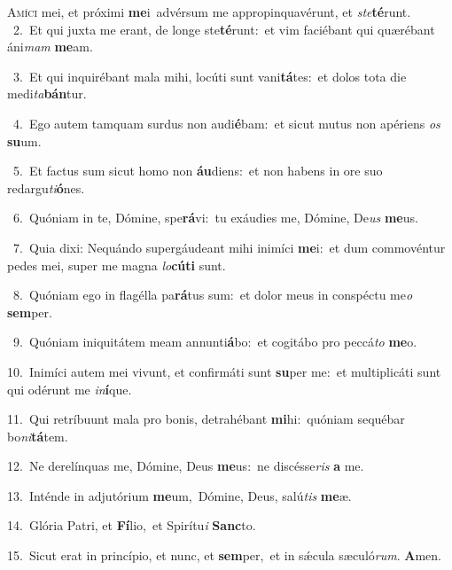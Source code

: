 \lettrine{\initial\textcolor{\initialcolor}{A}}{míci} mei, et próximi \textbf{me}\-i~\star advérsum me appropinquavérunt, et \textit{ste}\-\textbf{té}runt.\\
{\numbfont\textcolor{\numbcolor}{~2.}}~Et qui juxta me erant, de longe ste\-\textbf{té}\-runt:~\star et vim faciébant qui quærébant áni\textit{mam} \textbf{me}\-am.\par
{\numbfont\textcolor{\numbcolor}{~3.}}~Et qui inquirébant mala mihi, locúti sunt vani\-\textbf{tá}\-tes:~\star et dolos tota die medi\-\textit{ta}\-\textbf{bán}tur.\par
{\numbfont\textcolor{\numbcolor}{~4.}}~Ego autem tamquam surdus non audi\-\textbf{é}\-bam:~\star et sicut mutus non apériens \textit{os} \textbf{su}\-um.\par
{\numbfont\textcolor{\numbcolor}{~5.}}~Et factus sum sicut homo non \textbf{áu}\-diens:~\star et non habens in ore suo redargu\-\textit{ti}\-\textbf{ó}nes.\par
{\numbfont\textcolor{\numbcolor}{~6.}}~Quóniam in te, Dómine, spe\-\textbf{rá}\-vi:~\star tu exáudies me, Dómine, De\textit{us} \textbf{me}\-us.\par
{\numbfont\textcolor{\numbcolor}{~7.}}~Quia dixi: Nequándo supergáudeant mihi inimíci \textbf{me}\-i:~\star et dum commovéntur pedes mei, super me magna \textit{lo}\-\textbf{cú}\textbf{ti} sunt.\par
{\numbfont\textcolor{\numbcolor}{~8.}}~Quóniam ego in flagélla pa\-\textbf{rá}\-tus sum:~\star et dolor meus in conspéctu me\textit{o} \textbf{sem}\-per.\par
{\numbfont\textcolor{\numbcolor}{~9.}}~Quóniam iniquitátem meam annunti\-\textbf{á}\-bo:~\star et cogitábo pro peccá\textit{to} \textbf{me}\-o.\par
{\numbfont\textcolor{\numbcolor}{10.}}~Inimíci autem mei vivunt, et confirmáti sunt \textbf{su}\-per me:~\star et multiplicáti sunt qui odérunt me \textit{in}\-\textbf{í}que.\par
{\numbfont\textcolor{\numbcolor}{11.}}~Qui retríbuunt mala pro bonis, detrahébant \textbf{mi}\-hi:~\star quóniam sequébar bo\-\textit{ni}\-\textbf{tá}tem.\par
{\numbfont\textcolor{\numbcolor}{12.}}~Ne derelínquas me, Dómine, Deus \textbf{me}\-us:~\star ne discésse\textit{ris} \textbf{a} me.\par
{\numbfont\textcolor{\numbcolor}{13.}}~Inténde in adjutórium \textbf{me}\-um,~\star Dómine, Deus, salú\textit{tis} \textbf{me}\-æ.\par
{\numbfont\textcolor{\numbcolor}{14.}}~Glória Patri, et \textbf{Fí}\-lio,~\star et Spirítu\textit{i} \textbf{Sanc}\-to.\par
{\numbfont\textcolor{\numbcolor}{15.}}~Sicut erat in princípio, et nunc, et \textbf{sem}\-per,~\star et in sǽcula sæculó\-\textit{rum}\-. \textbf{A}\-men.\par
